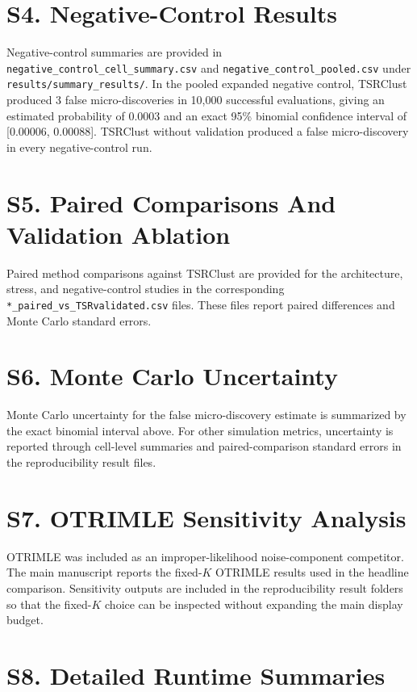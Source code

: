 \documentclass[pdflatex,sn-nature]{sn-jnl}
\begin{document}
\section*{S4. Negative-Control Results}

Negative-control summaries are provided in
\texttt{negative\_control\_cell\_summary.csv} and
\texttt{negative\_control\_pooled.csv} under
\texttt{results/summary\_results/}. In the pooled
expanded negative control, TSRClust produced 3 false micro-discoveries in
10,000 successful evaluations, giving an estimated probability of 0.0003 and an
exact 95\% binomial confidence interval of [0.00006, 0.00088]. TSRClust without
validation produced a false micro-discovery in every negative-control run.

\section*{S5. Paired Comparisons And Validation Ablation}

Paired method comparisons against TSRClust are provided for the
architecture, stress, and negative-control studies in the corresponding
\texttt{*\_paired\_vs\_TSRvalidated.csv} files. These files report paired
differences and Monte Carlo standard errors.



\section*{S6. Monte Carlo Uncertainty}

Monte Carlo uncertainty for the false micro-discovery estimate is summarized by
the exact binomial interval above. For other simulation metrics, uncertainty is
reported through cell-level summaries and paired-comparison standard errors in
the reproducibility result files.

\section*{S7. OTRIMLE Sensitivity Analysis}

OTRIMLE was included as an improper-likelihood noise-component competitor. The
main manuscript reports the fixed-\(K\) OTRIMLE results used in the headline
comparison. Sensitivity outputs are included in the reproducibility result
folders so that the fixed-\(K\) choice can be inspected without expanding the
main display budget.

\section*{S8. Detailed Runtime Summaries}
\end{document}
